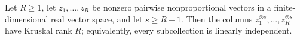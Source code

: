Let \(R\ge1\), let \(z_1,\ldots,z_R\) be nonzero pairwise nonproportional vectors in a finite-dimensional real vector space, and let \(s\ge R-1\). Then the columns \(z_1^{\otimes s},\ldots,z_R^{\otimes s}\) have Kruskal rank \(R\); equivalently, every subcollection is linearly independent.